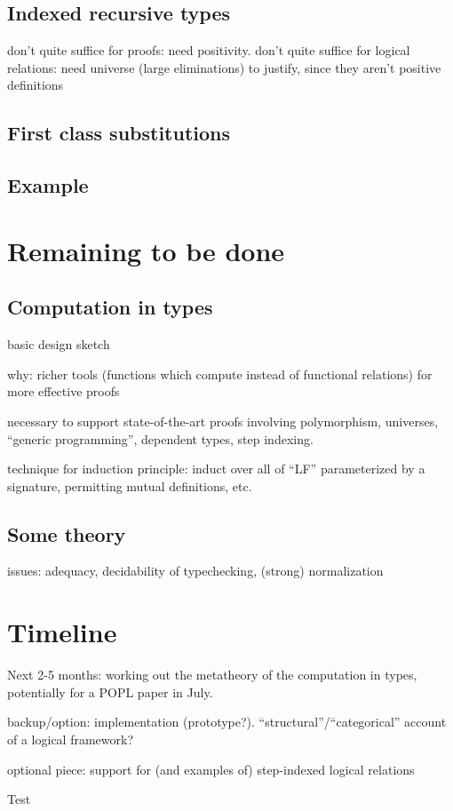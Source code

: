\documentclass{article}
\begin{document}
\subsection{Indexed recursive types}

don't quite suffice for proofs: need positivity. don't quite suffice
for logical relations: need universe (large eliminations) to justify,
since they aren't positive definitions
\subsection{First class substitutions}

\subsection{Example}
\section{Remaining to be done}
\subsection{Computation in types}
basic design sketch

why: richer tools (functions which compute instead of functional
relations) for more effective proofs

necessary to support state-of-the-art proofs involving polymorphism,
universes, ``generic programming'', dependent types, step indexing.

technique for induction principle: induct over all of ``LF''
parameterized by a signature, permitting mutual definitions, etc.
\subsection{Some theory}

issues: adequacy, decidability of typechecking, (strong) normalization
\section{Timeline}
Next 2-5 months: working out the metatheory of the computation in
types, potentially for a POPL paper in July.

backup/option: implementation (prototype?). ``structural''/``categorical'' account of a logical framework?

optional piece: support for (and examples of) step-indexed logical
relations

\begin{thebibliography}
Test
\end{thebibliography}
\end{document}
